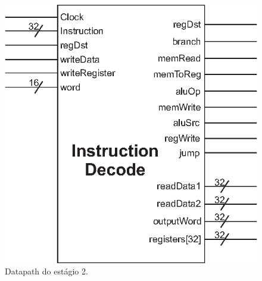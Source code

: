	\begin{figure}[ht]
		\begin{center}
		\includegraphics{./datapath/Graphic2.eps}
		\caption*{Datapath do estágio 2.}
		\end{center}
	\end{figure}
